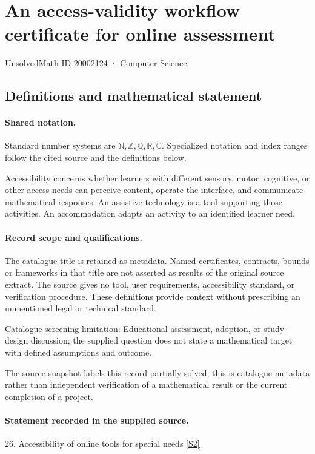 \documentclass[11pt]{article}
\newcommand{\sref}[2]{\hyperlink{source:#1:#2}{[S#2]}}
\begin{document}
\setcounter{section}{20002123}
\section{An access-validity workflow certificate for online assessment}\label{20002124}
{\small\sffamily UnsolvedMath ID 20002124 · Computer Science}
\subsection{Definitions and mathematical statement}

\paragraph{Shared notation.}Standard number systems are $\mathbb N,\mathbb Z,\mathbb Q,\mathbb R,\mathbb C$. Specialized notation and index ranges follow the cited source and the definitions below.


Accessibility concerns whether learners with different sensory, motor, cognitive, or other access needs can perceive content, operate the interface, and communicate mathematical responses. An assistive technology is a tool supporting those activities. An accommodation adapts an activity to an identified learner need.
\paragraph{Record scope and qualifications.}
The catalogue title is retained as metadata. Named certificates, contracts, bounds or frameworks in that title are not asserted as results of the original source extract.
The source gives no tool, user requirements, accessibility standard, or verification procedure. These definitions provide context without prescribing an unmentioned legal or technical standard.

Catalogue screening limitation: Educational assessment, adoption, or study-design discussion; the supplied question does not state a mathematical target with defined assumptions and outcome.

The source snapshot labels this record partially solved; this is catalogue metadata rather than independent verification of a mathematical result or the current completion of a project.
\paragraph{Statement recorded in the supplied source.}
26. Accessibility of online tools for special needs \sref{20002124}{2}
\end{document}
